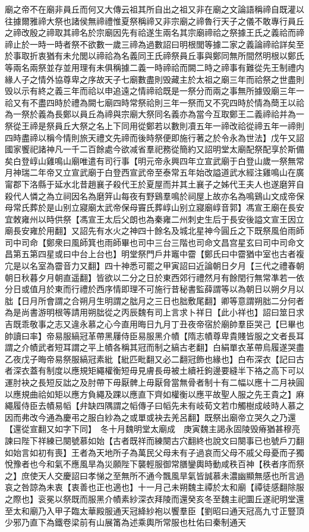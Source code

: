 廟之帝不在廟非員丘而何又大傳云祖其所自出之祖又非在廟之文論語稱禘自既灌以往據爾雅禘大祭也諸侯無禘禮惟夏祭稱禘又非宗廟之禘魯行天子之儀不敢專行員丘之禘改殷之禘取其禘名於宗廟因先有祫遂生兩名其宗廟禘祫之祭據王氏之義祫而禘禘止於一時一時者祭不欲數一歲三禘為過數詔曰明根閭等據二家之義論禘祫詳矣至於事取折衷猶有未允閭以禘祫為名義同王氏禘祭員丘事與鄭同無所間然明根以鄭氏等兩名兩祭並存並用理有未俱稱據二義一時禘祫而闕二時之禘事有難從先王制禮内緣人子之情外協尊卑之序故天子七廟數盡則毁藏主於太祖之廟三年而祫祭之世盡則毁以示有終之義三年而祫以申追遠之情禘祫既是一祭分而兩之事無所據毁廟三年一祫又有不盡四時於禮為闕七廟四時常祭祫則三年一祭而又不究四時於情為蕳王以祫為一祭於義為長鄭以員丘為禘與宗廟大祭同名義亦為當今互取鄭王二義禘祫并為一祭從王禘是祭員丘大祭之名上下同用從鄭若以數則凟五年一禘改祫從禘五年一禘則四時盡禘以稱今情則旅天禮文先禘而後時祭便即施行著之於令永為世法】戊午又詔國家饗祀諸神凡一千二百餘處今欲减省羣祀務從簡約又詔明堂太廟配祭配享於斯備矣白登崞山雞鳴山廟唯遣有司行事【明元帝永興四年立宣武廟于白登山歲一祭無常月神瑞二年帝又立宣武廟于白登西宣武帝至泰常五年始改謚道武水經注雞鳴山在廣甯郡下洛縣于延水北昔趙襄子殺代王於夏屋而并其土襄子之姊代王夫人也遂磨笄自殺代人憐之為立祠因名為磨笄山每夜有野鷄羣鳴於祠屋上故亦名為鳴鷄山文成帝保母常氏葬於是山别立寢廟太武帝保母竇氏葬崞山别立寢廟崞音郭】馮宣王廟在長安宜敇雍州以時供祭【馮宣王太后父朗也為秦雍二州刺史生后于長安後謚文宣王因立廟長安雍於用翻】又詔先有水火之神四十餘名及城北星神今圓丘之下既祭風伯雨師司中司命【鄭衆曰風師箕也雨師畢也司中三台三階也司命文昌宫星玄曰司中司命文昌第五第四星或曰中台上台也】明堂祭門戶井竈中霤【鄭氏曰中霤猶中室也古者複宂是以名室為霤音力又翻】四十神悉可罷之甲寅詔曰近論朝日夕月【三代之禮春朝朝日秋暮夕月朝直遥翻】皆欲以二分之日於東西郊行禮然月有餘閏行無常凖若一依分日或值月於東而行禮於西序情即理不可施行昔秘書監薛謂等以為朝日以朔夕月以朏【日月所會謂之合朔月生明謂之朏月之三日也胐敷尾翻】卿等意謂朔胐二分何者為是尚書游明根等請用朔朏從之丙辰魏有司上言求卜祥日【此小祥也】詔曰筮日求吉既乖敬事之志又違永慕之心今直用晦日九月丁丑夜帝宿於廟帥羣臣哭己【巳畢也帥讀曰率】帝易服縞冠革帶黑屨侍臣易服黑介幘【隋志幘尊卑貴賤皆服之文者長耳謂之介幘武者短耳謂之平上幘各稱其冠而制之縞古老翻】白絹單衣革帶烏履遂哭盡乙夜戊子晦帝易祭服縞冠素紕【紕匹毗翻又必二翻冠飾也緣也】白布深衣【記曰古者深衣蓋有制度以應規矩繩權衡短毋見膚長毋被土續衽鉤邊要縫半下袼之高下可以運肘袂之長短反詘之及肘帶下毋厭髀上毋厭脅當無骨者制十有二幅以應十二月袂圓以應規曲祫如矩以應方負繩及踝以應直下齊如權衡以應平故聖人服之先王貴之】麻繩履侍臣去幘易幍【弁缺四隅謂之幍傳子曰幍先未有岐荀文若巾觸樹成岐時人慕之因而弗改今通為慶弔之服白紗為之或單或袂去羌呂翻】既祭出廟帝立哭久之乃還【還從宣翻又如字下同】　冬十月魏明堂太廟成　庚寅魏主謁永固陵毁瘠猶甚穆亮諫曰陛下祥練已闋號慕如始【古者既祥而練闋古穴翻終也說文曰闋事已也號戶刀翻如始言如初有喪】王者為天地所子為萬民父母未有子過哀而父母不戚父母憂而子獨悅豫者也今和氣不應風旱為災願陛下襲輕服御常膳鑾輿時動咸秩百神【秩者序而祭之】庶使天人交慶詔曰孝悌之至無所不通今飄風旱氣皆誠慕未濃幽顯無感也所言過哀之咎諒為未衷【衷善也正也適也】十一月己未朔魏主禫於太和廟【禫徒感翻除服之際也】衮冕以祭既而服黑介幘素紗深衣拜陵而還癸亥冬至魏主祀圜丘遂祀明堂還至太和廟乃入甲子臨太華殿服通天冠絳紗袍以饗羣臣【劉昭曰通天冠高九寸正豎頂少邪乃直下為鐵卷梁前有山展筩為述乘輿所常服也杜佑曰秦制通天